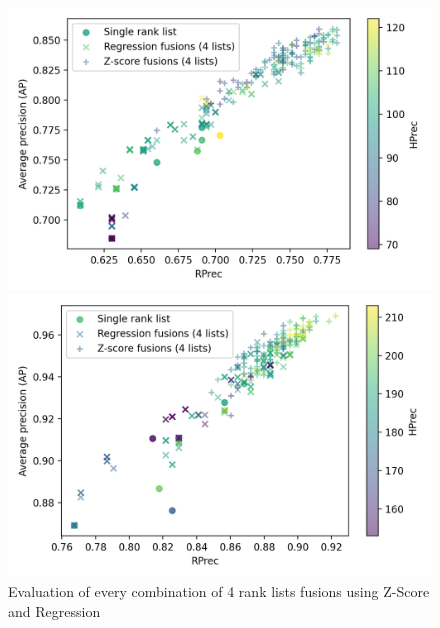 \begin{figure}
  \centering
  \caption{Evaluation of every combination of 4 rank lists fusions using Z-Score and Regression}
  \label{fig:fusion}

  \label{fig:fusion_evaluation_A}
  \includegraphics[width=\linewidth]{img/fusion_evaluation_A.png}

  \vspace{0.5cm}

  \label{fig:fusion_evaluation_B}
  \includegraphics[width=\linewidth]{img/fusion_evaluation_B.png}
\end{figure}

